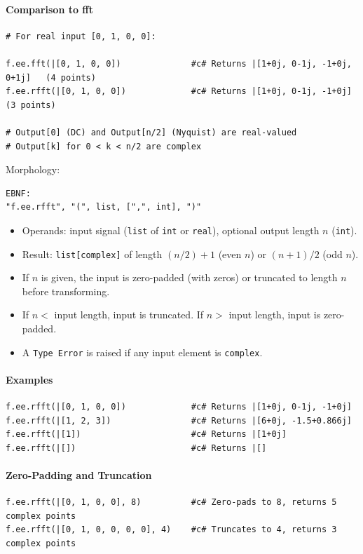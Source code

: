 \paragraph{Comparison to fft}
\begin{verbatim}
# For real input [0, 1, 0, 0]:

f.ee.fft(|[0, 1, 0, 0])              #c# Returns |[1+0j, 0-1j, -1+0j, 0+1j]   (4 points)
f.ee.rfft(|[0, 1, 0, 0])             #c# Returns |[1+0j, 0-1j, -1+0j]          (3 points)

# Output[0] (DC) and Output[n/2] (Nyquist) are real-valued
# Output[k] for 0 < k < n/2 are complex
\end{verbatim}

Morphology:
\begin{verbatim}
EBNF:
"f.ee.rfft", "(", list, [",", int], ")"
\end{verbatim}
\begin{itemize}
\item Operands: input signal (\texttt{list} of \texttt{int} or \texttt{real}), optional output length $n$ (\texttt{int}).
\item Result: \texttt{list[complex]} of length $(n/2)+1$ (even $n$) or $(n+1)/2$ (odd $n$).
\item If $n$ is given, the input is zero-padded (with zeros) or truncated to length $n$ before transforming.
\item If $n < $ input length, input is truncated. If $n > $ input length, input is zero-padded.
\item A \texttt{Type Error} is raised if any input element is \texttt{complex}.
\end{itemize}

\paragraph{Examples}
\begin{verbatim}
f.ee.rfft(|[0, 1, 0, 0])             #c# Returns |[1+0j, 0-1j, -1+0j]
f.ee.rfft(|[1, 2, 3])                #c# Returns |[6+0j, -1.5+0.866j]
f.ee.rfft(|[1])                      #c# Returns |[1+0j]
f.ee.rfft(|[])                       #c# Returns |[]
\end{verbatim}

\paragraph{Zero-Padding and Truncation}
\begin{verbatim}
f.ee.rfft(|[0, 1, 0, 0], 8)          #c# Zero-pads to 8, returns 5 complex points
f.ee.rfft(|[0, 1, 0, 0, 0, 0], 4)    #c# Truncates to 4, returns 3 complex points
\end{verbatim}

